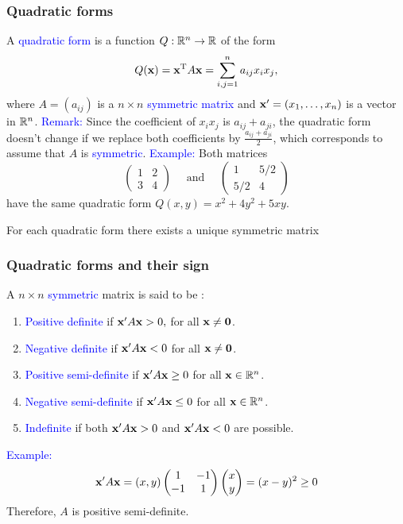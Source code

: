 \documentclass[11pt,aspectratio=169]{beamer}
\begin{document}
\begin{frame}
\frametitle{Quadratic forms}
\begin{small}
A \textcolor{blue}{quadratic form}  is a function $Q:\mathbb R^n \rightarrow \mathbb R$ of the form
$$
Q({\bf x})={\bf x}^{\rm T} A {\bf x}= \sum_{i,j=1}^n a_{ij} x_i x_j,
$$ 
where $A=(a_{ij})$ is a $n \times n$ \textcolor{blue}{symmetric matrix} and ${\bf x}'=(x_1,\ldots,x_n)$ is a vector in $\mathbb R^n$.
\vskip 10pt
\textcolor{blue}{Remark:} Since the  coefficient of $x_ix_j$ is $a_{ij}+a_{ji}$, the quadratic form doesn't change
if we replace both coefficients by $\frac{a_{ij}+a_{ji}}{2}$, which corresponds to assume that $A$ is \textcolor{blue}{symmetric}.
\vskip 10pt
\textcolor{blue}{Example:} Both matrices  
$$\begin{pmatrix}
1&2 \\
3&4
\end{pmatrix} \quad \text{ and } \quad \begin{pmatrix}
1& 5/2 \\
5/2& 4
\end{pmatrix}$$
have the same  quadratic form $Q(x,y)=x^2+4y^2+5xy$.

\begin{tiny}For each  quadratic form there exists  a unique symmetric matrix \end{tiny}

\end{small}
\end{frame}

\begin{frame}
\frametitle{Quadratic forms and their sign}
\begin{small}
A $n \times n$ \textcolor{blue}{symmetric} matrix is said to be :
\begin{enumerate}
\item \textcolor{blue}{Positive definite} if
$
{\bf x}' A {\bf x}>0,
$ 
for all ${\bf x} \neq {\bf 0}$.

\item \textcolor{blue}{Negative definite} if ${\bf x}' A {\bf x}<0$ for all ${\bf x} \neq {\bf 0}$.

\item \textcolor{blue}{Positive semi-definite} if ${\bf x}' A {\bf x}\geq0$ for all ${\bf x} \in \mathbb R^n$.

\item \textcolor{blue}{Negative semi-definite} if ${\bf x}' A {\bf x}\leq0$ for all ${\bf x} \in \mathbb R^n$.

\item \textcolor{blue}{Indefinite} if both $
{\bf x}' A {\bf x}>0
$ and $
{\bf x}' A {\bf x}<0
$ are possible.
\end{enumerate}
\vskip 12pt
\textcolor{blue}{Example:}
$$
{\bf x}' A {\bf x}=(x,y) \begin{pmatrix} 1 & -1 \\ -1 & 1 \end{pmatrix}
\begin{pmatrix} x \\ y \end{pmatrix}=(x-y)^2 \geq 0
$$
Therefore, $A$ is positive semi-definite.
\end{small}
\end{frame}
\end{document}
